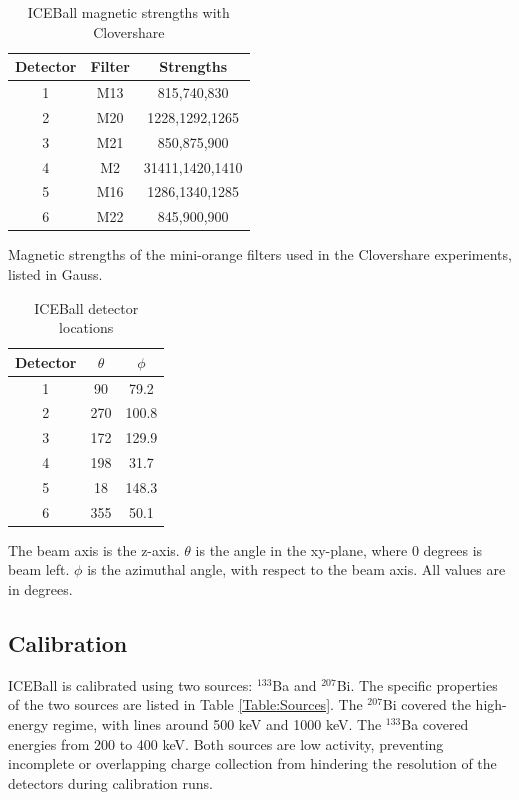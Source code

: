 \begin{table}[]
    \centering
    \caption{ICEBall magnetic strengths with Clovershare}
    \begin{tabular}{c|c|c} \toprule
         Detector & Filter & Strengths \\
         \hline
         1 & M13 & 815,740,830 \\ 
         2 & M20 & 1228,1292,1265\\
         3 & M21 & 850,875,900 \\
         4 & M2 & 31411,1420,1410\\
         5 & M16 & 1286,1340,1285\\
         6 & M22 & 845,900,900\\ \bottomrule
    \end{tabular}
    \footnotesize
    \item Magnetic strengths of the mini-orange filters used in the Clovershare experiments, listed in Gauss. 
    \label{tab:ICE_Magnet}
\end{table}

\begin{table}[]
    \centering
    \caption{ICEBall detector locations }
    \begin{tabular}{c|c|c} \toprule
         Detector & $\theta$ & $\phi$  \\
         \hline
         1 & 90 & 79.2 \\ 
         2 & 270 & 100.8\\
         3 & 172 & 129.9\\
         4 & 198 & 31.7\\
         5 & 18 & 148.3\\
         6 & 355 & 50.1\\ \bottomrule
    \end{tabular}
    \footnotesize
    \item The beam axis is the z-axis. $\theta$ is the angle in the xy-plane, where 0 degrees is beam left. $\phi$ is the azimuthal angle, with respect to the beam axis. All values are in degrees.
    \label{tab:ICE_Det_Loc}
\end{table}

\subsection{Calibration}

ICEBall is calibrated using two sources: $^{133}$Ba and $^{207}$Bi. The specific properties of the two sources are listed in Table \ref{Table:Sources}. The $^{207}$Bi covered the high-energy regime, with lines around 500 keV and 1000 keV. The $^{133}$Ba covered energies from 200 to 400 keV. Both sources are low activity, preventing incomplete or overlapping charge collection from hindering the resolution of the detectors during calibration runs.

